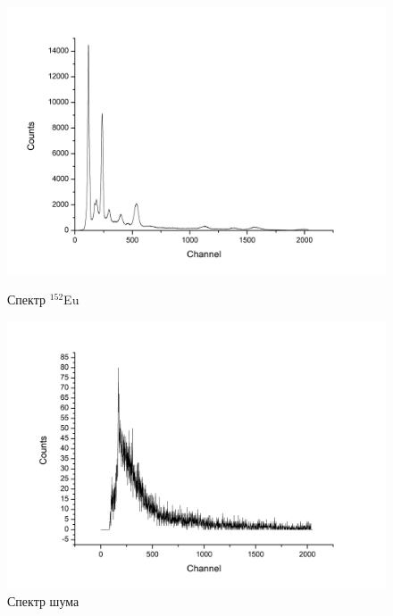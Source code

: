 \documentclass[a4paper]{article}
\begin{document}
\begin{figure}[ht]
\begin{center}
\begin{minipage}[h]{0.48\linewidth}
\includegraphics[width=1\linewidth]{image/Eu.png}
\caption{Спектр $^{152}$Eu} %
\end{minipage}
\hfill 
\begin{minipage}[ht]{0.48\linewidth}
\includegraphics[width=1\linewidth]{image/background.png}
\caption{Спектр шума}
\end{minipage}
\end{center}
\end{figure}
\end{document}
